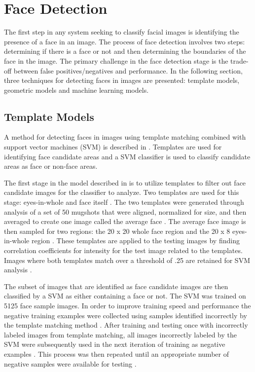 

%

\section{Face Detection} \label{FaceDetection}
The first step in any system seeking to classify facial images is identifying the presence of a face in an image. The process of face detection involves two steps: determining if there is a face or not and then determining the boundaries of the face in the image. The primary challenge in the face detection stage is the trade-off between false positives/negatives and performance. In the following section, three techniques for detecting faces in images are presented: template models, geometric models and machine learning models.

\subsection{Template Models}

A method for detecting faces in images using template matching combined with support vector machines (SVM) is described in \cite{ai2001face}. Templates are used for identifying face candidate areas and a SVM classifier is used to classify candidate areas as face or non-face areas.

The first stage in the model described in \cite{ai2001face} is to utilize templates to filter out face candidate images for the classifier to analyze. Two templates are used for this stage: eyes-in-whole and face itself \cite{ai2001face}. The two templates were generated through analysis of a set of 50 mugshots that were aligned, normalized for size, and then averaged to create one image called the average face \cite{ai2001face}. The average face image is then sampled for two regions: the 20 x 20 whole face region and the 20 x 8 eyes-in-whole region \cite{ai2001face}. These templates are applied to the testing images by finding correlation coefficients for intensity for the test image related to the templates. Images where both templates match over a threshold of .25 are retained for SVM analysis \cite{ai2001face}.

The subset of images that are identified as face candidate images are then classified by a SVM as either containing a face or not. The SVM was trained on 5125 face sample images. In order to improve training speed and performance the negative training examples were collected using samples identified incorrectly by the template matching method \cite{ai2001face}. After training and testing once with incorrectly labeled images from template matching, all images incorrectly labeled by the SVM were subsequently used in the next iteration of training as negative examples \cite{ai2001face}. This process was then repeated until an appropriate number of negative samples were available for testing \cite{ai2001face}.

